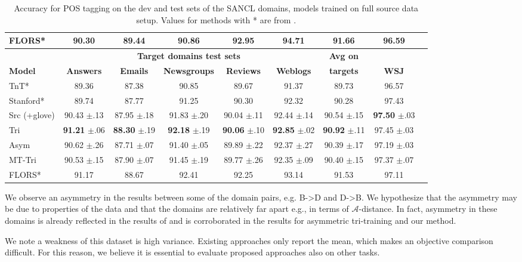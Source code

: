 \documentclass[11pt,a4paper]{article}
\begin{document}
\begin{table*}[ht!]
{\begin{tabular}{l c c c c c c c c}
\midrule 
FLORS*  & 90.30 & 89.44 & 90.86 & 92.95 & 94.71 & 91.66 & 96.59\\
\bottomrule
& \multicolumn{5}{c}{\cellcolor[gray]{.85}\textbf{Target domains test sets}} & \textbf{Avg on} \\
\textbf{Model} & \textbf{Answers} & \textbf{Emails} & \textbf{Newsgroups} & \textbf{Reviews} & \textbf{Weblogs} & \textbf{targets} & \textbf{WSJ} \\
TnT* & 89.36 & 87.38 & 90.85 & 89.67 & 91.37 & 89.73 & 96.57 \\
Stanford* & 89.74 & 87.77 & 91.25 & 90.30 & 92.32 & 90.28 & 97.43 \\
\midrule
Src (+glove) & 90.43 $\pm$.13 & 87.95 $\pm$.18 & 91.83 $\pm$.20 & 90.04 $\pm$.11& 92.44 $\pm$.14 & 90.54 $\pm$.15 & \textbf{97.50} $\pm$.03\\ 
Tri & \textbf{91.21} $\pm$.06 & \textbf{88.30} $\pm$.19 & \textbf{92.18} $\pm$.19 & \textbf{90.06} $\pm$.10 & \textbf{92.85} $\pm$.02 & \textbf{90.92} $\pm$.11 &  97.45 $\pm$.03
\\ Asym   & 90.62 $\pm$.26 & 87.71 $\pm$.07 & 91.40 $\pm$.05 & 89.89 $\pm$.22 & 92.37 $\pm$.27 & 90.39 $\pm$.17 & 97.19 $\pm$.03\\
MT-Tri & 90.53 $\pm$.15 & 87.90  $\pm$.07 & 91.45 $\pm$.19 & 89.77 $\pm$.26 & 92.35 $\pm$.09 & 90.40 $\pm$.15 & 97.37 $\pm$.07 \\
\midrule
FLORS* & 91.17 & 88.67 & 92.41 & 92.25 & 93.14 & 91.53 & 97.11\\
\bottomrule
\end{tabular}} \caption{Accuracy for POS tagging  on the dev and test sets of the SANCL domains, models trained on full source data setup. Values for methods with * are from \cite{Schnabel2014}.} \label{tbl:POS-dev-test}
\end{table*}


We observe an asymmetry in the results between some of the domain pairs, e.g. B->D and D->B. We hypothesize that the asymmetry may be due to properties of the data and that the domains are relatively far apart e.g., in terms of $\mathcal{A}$-distance. In fact, asymmetry in these domains is already reflected in the results of \citet{Blitzer2007} and is corroborated in the results for asymmetric tri-training \cite{Saito2017} and our method. 

We note a weakness of this dataset is high variance. Existing approaches only report the mean, which makes an objective comparison difficult. For this reason, we believe it is essential to evaluate proposed approaches also on other tasks.
\end{document}
